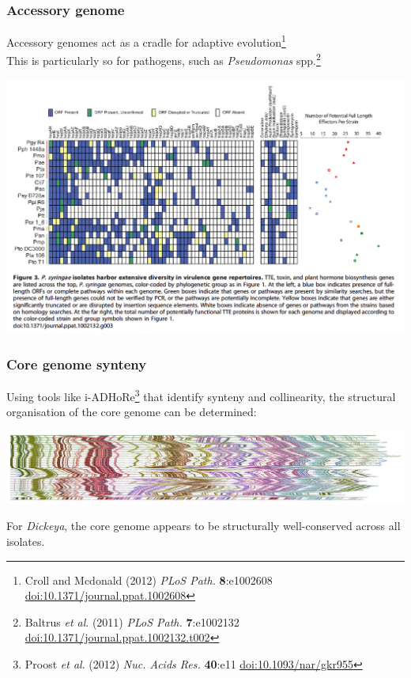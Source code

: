 \begin{frame}
  \frametitle{Accessory genome}
  Accessory genomes act as a cradle for adaptive evolution\footnote{\tiny{Croll and Mcdonald (2012) \textit{PLoS Path.} \textbf{8}:e1002608 \href{http://dx.doi.org/10.1371/journal.ppat.1002608}{doi:10.1371/journal.ppat.1002608}}} \\[0.2cm]
  This is particularly so for pathogens, such as \textit{Pseudomonas} spp.\footnote{\tiny{Baltrus \textit{et al}. (2011) \textit{PLoS Path.} \textbf{7}:e1002132 \href{http://dx.doi.org/10.1371/journal.ppat.1002132.t002}{doi:10.1371/journal.ppat.1002132.t002}}}
  \begin{center}
      \includegraphics[height=0.5\textheight]{images/pa_virulence} 
  \end{center}
\end{frame}

\begin{frame}
  \frametitle{Core genome synteny}
  Using tools like i-ADHoRe\footnote{\tiny{Proost \textit{et al}. (2012) \textit{Nuc. Acids Res.} \textbf{40}:e11 \href{http://dx.doi.org/10.1093/nar/gkr955}{doi:10.1093/nar/gkr955}}} that identify synteny and collinearity, the structural organisation of the core genome can be determined:
  \begin{center}
      \includegraphics[width=1\textwidth]{images/dickeya_core_collinear_small} 
  \end{center}
  For \textit{Dickeya}, the core genome appears to be structurally well-conserved across all isolates.
\end{frame}

